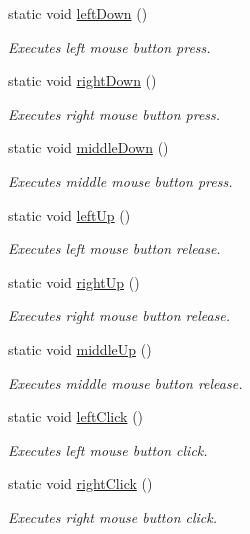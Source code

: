 \begin{DoxyCompactItemize}
static void \hyperlink{class_lua_api_engine_a5942498f999031601960d890b259536b}{left\-Down} ()
\begin{DoxyCompactList}\small\item\em Executes left mouse button press. \end{DoxyCompactList}\item 
static void \hyperlink{class_lua_api_engine_a14df77fdabe3ddf5dd19c35e70acb2d8}{right\-Down} ()
\begin{DoxyCompactList}\small\item\em Executes right mouse button press. \end{DoxyCompactList}\item 
static void \hyperlink{class_lua_api_engine_abea870a5edb171b0bc2345dd1e1e7b95}{middle\-Down} ()
\begin{DoxyCompactList}\small\item\em Executes middle mouse button press. \end{DoxyCompactList}\item 
static void \hyperlink{class_lua_api_engine_a926f72169c400bb32186737f03208e1c}{left\-Up} ()
\begin{DoxyCompactList}\small\item\em Executes left mouse button release. \end{DoxyCompactList}\item 
static void \hyperlink{class_lua_api_engine_ae8b09733792cc95ca22654be8074bfbf}{right\-Up} ()
\begin{DoxyCompactList}\small\item\em Executes right mouse button release. \end{DoxyCompactList}\item 
static void \hyperlink{class_lua_api_engine_a2cd4a53a99e262aa9d5e83a2b34b6538}{middle\-Up} ()
\begin{DoxyCompactList}\small\item\em Executes middle mouse button release. \end{DoxyCompactList}\item 
static void \hyperlink{class_lua_api_engine_ae857b39d951f50a206989c3422cb5494}{left\-Click} ()
\begin{DoxyCompactList}\small\item\em Executes left mouse button click. \end{DoxyCompactList}\item 
static void \hyperlink{class_lua_api_engine_a7b3664b6f2593d3bd817edeee61a18e6}{right\-Click} ()
\begin{DoxyCompactList}\small\item\em Executes right mouse button click. \end{DoxyCompactList}\item 

\end{DoxyCompactItemize}
